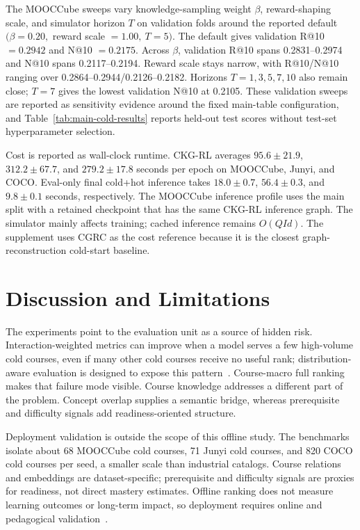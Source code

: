 \documentclass[letterpaper]{article}
\begin{document}
The MOOCCube sweeps vary knowledge-sampling weight \(\beta\), reward-shaping scale, and simulator horizon \(T\) on validation folds around the reported default \((\beta=0.20,\) reward scale \(=1.00,\ T=5)\). The default gives validation R@10 \(=0.2942\) and N@10 \(=0.2175\). Across \(\beta\), validation R@10 spans 0.2831--0.2974 and N@10 spans 0.2117--0.2194. Reward scale stays narrow, with R@10/N@10 ranging over 0.2864--0.2944/0.2126--0.2182. Horizons \(T=1,3,5,7,10\) also remain close; \(T=7\) gives the lowest validation N@10 at 0.2105. These validation sweeps are reported as sensitivity evidence around the fixed main-table configuration, and Table~\ref{tab:main-cold-results} reports held-out test scores without test-set hyperparameter selection.

Cost is reported as wall-clock runtime. CKG-RL averages \(95.6\pm21.9\), \(312.2\pm67.7\), and \(279.2\pm17.8\) seconds per epoch on MOOCCube, Junyi, and COCO. Eval-only final cold+hot inference takes \(18.0\pm0.7\), \(56.4\pm0.3\), and \(9.8\pm0.1\) seconds, respectively. The MOOCCube inference profile uses the main split with a retained checkpoint that has the same CKG-RL inference graph. The simulator mainly affects training; cached inference remains \(O(QId)\). The supplement uses CGRC as the cost reference because it is the closest graph-reconstruction cold-start baseline.

\section{Discussion and Limitations}
The experiments point to the evaluation unit as a source of hidden risk. Interaction-weighted metrics can improve when a model serves a few high-volume cold courses, even if many other cold courses receive no useful rank; distribution-aware evaluation is designed to expose this pattern~\cite{ekstrand2024distributional,bauer2024landscape}. Course-macro full ranking makes that failure mode visible. Course knowledge addresses a different part of the problem. Concept overlap supplies a semantic bridge, whereas prerequisite and difficulty signals add readiness-oriented structure.

Deployment validation is outside the scope of this offline study. The benchmarks isolate about 68 MOOCCube cold courses, 71 Junyi cold courses, and 820 COCO cold courses per seed, a smaller scale than industrial catalogs. Course relations and embeddings are dataset-specific; prerequisite and difficulty signals are proxies for readiness, not direct mastery estimates. Offline ranking does not measure learning outcomes or long-term impact, so deployment requires online and pedagogical validation~\cite{dasilva2023educationalrs,stray2024values}.
\end{document}
